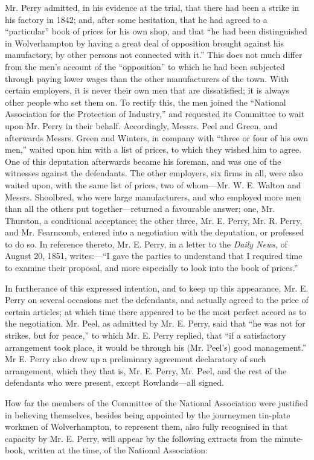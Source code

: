 Mr. Perry admitted, in his evidence at the trial, that there had been a
strike in his factory in 1842; and, after some hesitation, that he had
agreed to a ``particular'' book of prices for his own shop, and that
``he had been distinguished in Wolverhampton by having a great deal of
opposition brought against his manufactory, by other persons not
connected with it.'' This does not much differ from the men's account of
the ``opposition'' to which he had been subjected through paying lower
wages than the other manufacturers of the town. With certain employers,
it is never their own men that are dissatisfied; it is always other
people who set them on. To rectify this, the men joined the ``National
Association for the Protection of Industry,'' and requested its
Committee to wait upon Mr. Perry in their behalf. Accordingly, Messrs.
Peel and Green, and afterwards Messrs. Green and Winters, in company
with ``three or four of his own men,'' waited upon him with a list of
prices, to which they wished him to agree. One of this deputation
afterwards became his foreman, and was one of the witnesses against the
defendants. The other employers, six firms in all, were also waited
upon, with the same list of prices, two of whom---Mr. W. E. Walton and
Messrs. Shoolbred, who were large manufacturers, and who employed more
men than all the others put together---returned a favourable answer;
one, Mr. Thurston, a conditional acceptance; the other three, Mr. E.
Perry, Mr. R. Perry, and Mr. Fearncomb, entered into a negotiation with
the deputation, or professed to do so. In reference thereto, Mr. E.
Perry, in a letter to the \textit{Daily News}, of August 20, 1851,
writes:---``I gave the parties to understand that I required time to
examine their proposal, and more especially to look into the book of
prices.''

In furtherance of this expressed intention, and to keep up this
appearance, Mr. E. Perry on several occasions met the defendants, and
actually agreed to the price of certain articles; at which time there
appeared to be the most perfect accord as to the negotiation. Mr. Peel,
as admitted by Mr. E. Perry, said that ``he was not for strikes, but for
peace,'' to which Mr. E. Perry replied, that ``if a satisfactory
arrangement took place, it would be through his (Mr. Peel's) good
management.'' Mr E. Perry also drew up a preliminary agreement
declaratory of such arrangement, which they that is, Mr. E. Perry, Mr.
Peel, and the rest of the defendants who were present, except
Rowlands---all signed.

How far the members of the Committee of the National Association were
justified in believing themselves, besides being appointed by the
journeymen tin-plate workmen of Wolverhampton, to represent them, also
fully recognised in that capacity by Mr. E. Perry, will appear by the
following extracts from the minute-book, written at the time, of the
National Association:

